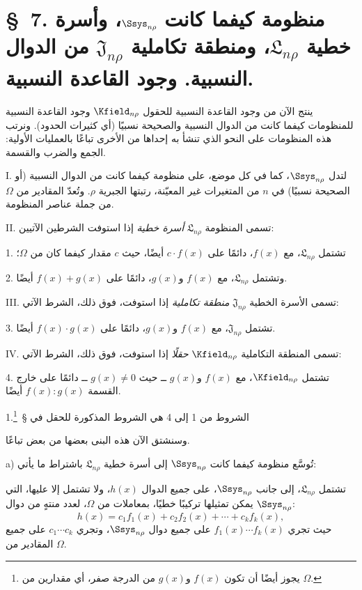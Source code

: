 \documentclass[11pt]{article}
\newcommand{\srcLTR}[1]{\relax\ifmmode\text{\mbox{\babelsublr{\foreignlanguage{english}{#1}}}}\else\babelsublr{\foreignlanguage{english}{#1}}\fi}
\newcommand{\srcfn}[2]{\begingroup\renewcommand{\thefootnote}{\srcLTR{#1}}\footnote{#2}\addtocounter{footnote}{-1}\endgroup}
\providecommand{\Lsys}{\mathfrak{L}}
\providecommand{\Jdom}{\mathfrak{J}}
\begin{document}
\section*{\S\ 7. منظومة كيفما كانت $\Ssys_{n\rho}$، وأسرة خطية $\Lsys_{n\rho}$، ومنطقة تكاملية $\Jdom_{n\rho}$ من الدوال النسبية. وجود القاعدة النسبية.}

ينتج الآن من وجود القاعدة النسبية للحقول $\Kfield_{n\rho}$ وجود القاعدة النسبية للمنظومات كيفما كانت من الدوال النسبية والصحيحة نسبيًا (أي كثيرات الحدود). ونرتب هذه المنظومات على النحو الذي تنشأ به إحداها من الأخرى تباعًا بالعمليات الأولية: الجمع والضرب والقسمة.

I. لتدل $\Ssys_{n\rho}$، كما في كل موضع، على منظومة كيفما كانت من الدوال النسبية (أو الصحيحة نسبيًا) في $n$ من المتغيرات غير المعيّنة، رتبتها الجبرية $\rho$. وتُعدّ المقادير من $\Omega$ من جملة عناصر المنظومة.

II. تسمى المنظومة $\Lsys_{n\rho}$ \emph{أسرة خطية} إذا استوفت الشرطين الآتيين:

1. تشتمل $\Lsys_{n\rho}$، مع $f(x)$، دائمًا على $c\cdot f(x)$ أيضًا، حيث $c$ مقدار كيفما كان من $\Omega$؛

2. وتشتمل $\Lsys_{n\rho}$، مع $f(x)$ و$g(x)$، دائمًا على $f(x)+g(x)$ أيضًا.

III. تسمى الأسرة الخطية $\Jdom_{n\rho}$ \emph{منطقة تكاملية} إذا استوفت، فوق ذلك، الشرط الآتي:

3. تشتمل $\Jdom_{n\rho}$، مع $f(x)$ و$g(x)$، دائمًا على $f(x)\cdot g(x)$ أيضًا.

IV. تسمى المنطقة التكاملية $\Kfield_{n\rho}$ \emph{حقلًا} إذا استوفت، فوق ذلك، الشرط الآتي:

4. تشتمل $\Kfield_{n\rho}$، مع $f(x)$ و$g(x)$ ــ حيث $g(x)\ne0$ ــ دائمًا على خارج القسمة $f(x):g(x)$ أيضًا.

الشروط من 1 إلى 4 هي الشروط المذكورة للحقل في \S\ 1.\srcfn{*)}{يجوز أيضًا أن تكون $f(x)$ و$g(x)$ من الدرجة صفر، أي مقدارين من $\Omega$.}

وسنشتق الآن هذه البنى بعضها من بعض تباعًا.

a) تُوسَّع منظومة كيفما كانت $\Ssys_{n\rho}$ إلى أسرة خطية $\Lsys_{n\rho}$ باشتراط ما يأتي:

تشتمل $\Lsys_{n\rho}$، إلى جانب $\Ssys_{n\rho}$، على جميع الدوال $h(x)$، ولا تشتمل إلا عليها، التي يمكن تمثيلها تركيبًا خطيًا، بمعاملات من $\Omega$، لعدد منتهٍ من دوال $\Ssys_{n\rho}$:
\[
h(x)=c_1f_1(x)+c_2f_2(x)+\cdots+c_kf_k(x),
\]
حيث تجري $f_1(x)\cdots f_k(x)$ على جميع دوال $\Ssys_{n\rho}$، وتجري $c_1\cdots c_k$ على جميع المقادير من $\Omega$.
\end{document}
